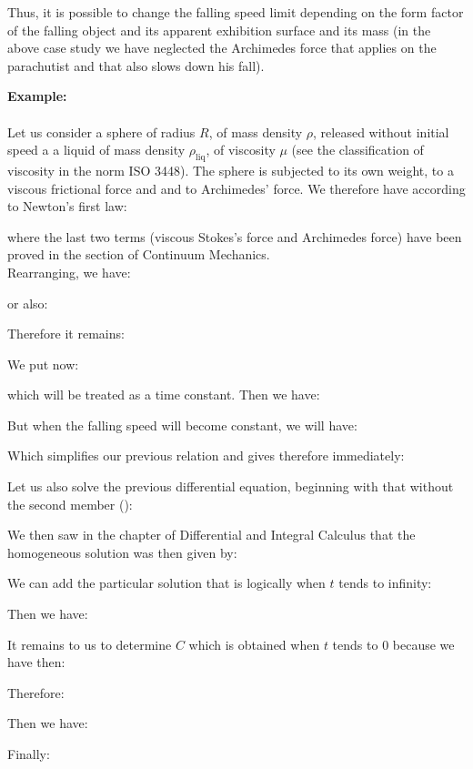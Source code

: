 	Thus, it is possible to change the falling speed limit depending on the form factor of the falling object and its apparent exhibition surface and its mass (in the above case study we have neglected the Archimedes force that applies on the parachutist and that also slows down his fall).
	\begin{tcolorbox}[colframe=black,colback=white,sharp corners]
	\textbf{{\Large {}}Example:}\\\\
	Let us consider a sphere of radius $R$, of mass density $\rho$, released without initial speed a a liquid of mass density $\rho_{\text{liq}}$, of viscosity $\mu$ (see the classification of viscosity in the norm ISO 3448). The sphere is subjected to its own weight, to a viscous frictional force and and to Archimedes' force.	We therefore have according to Newton's first law:
	
	where the last two terms (viscous Stokes's force and Archimedes force) have been proved in the section of Continuum Mechanics.\\

	Rearranging, we have:
	
	or also:
	
	Therefore it remains:
	
	We put now:
	
	which will be treated as a time constant. Then we have:
	
	But when the falling speed will become constant, we will have:
	
	Which simplifies our previous relation and gives therefore immediately:
	
	\end{tcolorbox}
	
	\begin{tcolorbox}[colframe=black,colback=white,sharp corners]
	Let us also solve the previous differential equation, beginning with that without the second member ():
	
	We then saw in the chapter of Differential and Integral Calculus that the homogeneous solution was then given by:
	
	We can add the particular solution that is logically when $t$ tends to infinity:
	
	Then we have:
	
	It remains to us to determine $C$ which is obtained when $t$ tends to $0$ because we have then:
	
	Therefore:
	
	Then we have:
	
	Finally:
	
	\end{tcolorbox}
	
